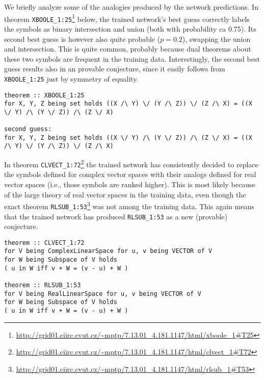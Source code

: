 \documentclass{ecai}
\newcommand{\nbc}[3]{
                {\colorbox{#3}{\bfseries\sffamily\scriptsize\textcolor{white}{#1}}}
                {\textcolor{#3}{\sffamily\small$\blacktriangleright$\textit{#2}$\blacktriangleleft$}}
}
\newcommand{\todoat}[2]{\nbc{TODO: #1}{#2}{todocolor}}
\begin{document}
We briefly analyze some of the analogies produced by the network predictions.
In theorem
\texttt{XBOOLE\_1:25}\footnote{\url{http://grid01.ciirc.cvut.cz/~mptp/7.13.01_4.181.1147/html/xboole_1\#T25}}
below, the trained network's best guess correctly labels the symbols
as binary intersection and union (both with probability ca 0.75).
Its second best guess is however also quite probable ($p=0.2$),
swapping the union and intersection. This is quite common, probably
because dual theorems about these two symbols are frequent in the
training data. Interestingly, the second best guess results also in an
provable conjecture, since it easily follows from
\texttt{XBOOLE\_1:25} just by symmetry of equality.
\begin{lstlisting}[language=Mizar,basicstyle=\ttfamily\scriptsize]
theorem :: XBOOLE_1:25
for X, Y, Z being set holds ((X /\ Y) \/ (Y /\ Z)) \/ (Z /\ X) = ((X \/ Y) /\ (Y \/ Z)) /\ (Z \/ X)

second guess:
for X, Y, Z being set holds ((X \/ Y) /\ (Y \/ Z)) /\ (Z \/ X) = ((X /\ Y) \/ (Y /\ Z)) \/ (Z /\ X)
\end{lstlisting}
In theorem
\texttt{CLVECT\_1:72}\footnote{\url{http://grid01.ciirc.cvut.cz/~mptp/7.13.01_4.181.1147/html/clvect_1\#T72}}
the trained network has consistently decided to replace the symbols
defined for complex vector spaces with their analogs defined for real
vector spaces (i.e., those symbols are ranked higher). This is most likely because of the large theory of real
vector spaces in the training data, even though the exact theorem
\texttt{RLSUB\_1:53}\footnote{\url{http://grid01.ciirc.cvut.cz/~mptp/7.13.01_4.181.1147/html/rlsub_1\#T53}} was not among the training data. This again means that the trained network has produced \texttt{RLSUB\_1:53} as a new (provable) conjecture.
\begin{lstlisting}[language=Mizar,basicstyle=\ttfamily\scriptsize]
theorem :: CLVECT_1:72
for V being ComplexLinearSpace for u, v being VECTOR of V
for W being Subspace of V holds 
( u in W iff v + W = (v - u) + W )

theorem :: RLSUB_1:53
for V being RealLinearSpace for u, v being VECTOR of V
for W being Subspace of V holds 
( u in W iff v + W = (v - u) + W )
\end{lstlisting}
\end{document}
